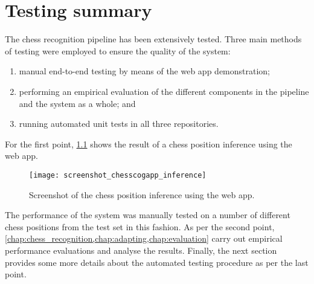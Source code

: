 \documentclass[../../report.tex]{subfiles}
\begin{document}
\chapter{Testing summary}
The chess recognition pipeline has been extensively tested. 
Three main methods of testing were employed to ensure the quality of the system: 
\begin{enumerate}
    \item manual end-to-end testing by means of the web app demonstration;
    \item performing an empirical evaluation of the different components in the pipeline and the system as a whole; and
    \item running automated unit tests in all three repositories.
\end{enumerate}
For the first point, \cref{fig:chesscogapp_inference} shows the result of a chess position inference using the web app.
\begin{figure}
    \centering
    \texttt{[image: screenshot\_chesscogapp\_inference]}
    \caption{Screenshot of the chess position inference using the web app.}
    \label{fig:chesscogapp_inference}
\end{figure}
The performance of the system was manually tested on a number of different chess positions from the test set in this fashion.
As per the second point, \cref{chap:chess_recognition,chap:adapting,chap:evaluation} carry out empirical performance evaluations and analyse the results.
Finally, the next section provides some more details about the automated testing procedure as per the last point.
\end{document}
